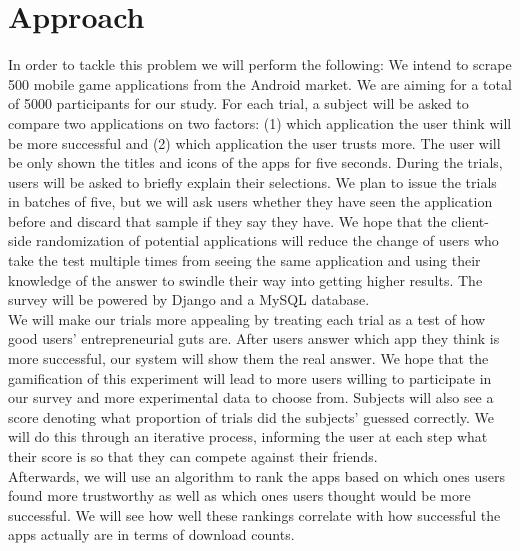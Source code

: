 \section{Approach}

In order to tackle this problem we will perform the following: We intend to scrape 500 mobile game applications from the Android market. We are aiming for a total of 5000 participants for our study. For each trial, a subject will be asked to compare two applications on two factors: (1) which application the user think will be more successful and (2) which application the user trusts more. The user will be only shown the titles and icons of the apps for five seconds. During the trials, users will be asked to briefly explain their selections. We plan to issue the trials in batches of five, but we will ask users whether they have seen the application before and discard that sample if they say they have.  We hope that the client-side randomization of potential applications will reduce the change of users who take the test multiple times from seeing the same application and using their knowledge of the answer to swindle their way into getting higher results. The survey will be powered by Django and a MySQL database. \\

We will make our trials more appealing by treating each trial as a test of how good users' entrepreneurial guts are. After users answer which app they think is more successful, our system will show them the real answer. We hope that the gamification of this experiment will lead to more users willing to participate in our survey and more experimental data to choose from. Subjects will also see a score denoting what proportion of trials did the subjects' guessed correctly.  We will do this through an iterative process, informing the user at each step what their score is so that they can compete against their friends. \\

Afterwards, we will use an algorithm to rank the apps based on which ones users found more trustworthy as well as which ones users thought would be more successful. We will see how well these rankings correlate with how successful the apps actually are in terms of download counts.


